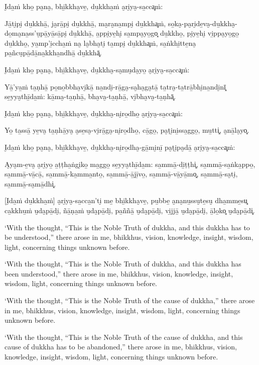 I̮da̱ṁ kho̱ pa̮na̮, bhi̱kkha̮ve̱, du̱kkha̱ṁ a̮ri̮ya̮-sa̱cca͓ṁ:

Jā̱ti̮pi̮ du̱kkhā̱, ja̮rā̱pi̮ du̱kkhā̱, ma̮ra̮na̱mpi̮ du̱kkha͓ṁ,
so̱ka̮-pa̮ri̮de̱va̮-du̱kkha̮-do̱ma̮na̱ss'u̮pā̱yā̱sā̱pi̮ du̱kkhā̱, a̱ppi̮ye̱hi̮ sa̱mpa̮yo̱go͓
du̱kkho̱, pi̮ye̱hi̮ vi̱ppa̮yo̱go̱ du̱kkho̱, ya̱mp'i̱ccha̱ṁ na̮ la̮bha̮ti̮ ta̱mpi̮ du̱kkha͓ṁ,
sa̱ṅkhi̱tte̱na̮ pa̱ñcu̮pā̱dā̱na̱kkha̱ndhā̱ du̱kkhā͓.

I̮da̱ṁ kho̱ pa̮na̮, bhi̱kkha̮ve̱, du̱kkha̮-sa̮mu̮da̮yo̱ a̮ri̮ya̮-sa̱cca͓ṁ:

Yā̱'ya̱ṁ ta̱ṇhā̱ po̱no̱bbha̮vi̮kā̱ na̱ndi̮-rā̱ga̮-sa̮ha̮ga̮tā̱ ta̱tra̮-ta̱trā̱bhi̮na̱ndi̮nī͓
se̱yya̮thī̱da̱ṁ: kā̱ma̮-ta̱ṇhā̱, bha̮va̮-ta̱ṇhā̱, vi̮bha̮va̮-ta̱ṇhā͓.

I̮da̱ṁ kho̱ pa̮na̮, bhi̱kkha̮ve̱, du̱kkha̮-ni̮ro̱dho̱ a̮ri̮ya̮-sa̱cca͓ṁ:

Yo̱ ta̱ssā̱ ye̱va̮ ta̱ṇhā̱ya̮ a̮se̱sa̮-vi̮rā̱ga̮-ni̮ro̱dho̱, cā̱go̱, pa̮ṭi̮ni̱ssa̱ggo̱, mu̱tti͓,
a̮nā̱la̮yo͓.

I̮da̱ṁ kho̱ pa̮na̮, bhi̱kkha̮ve̱, du̱kkha̮-ni̮ro̱dha̮-gā̱mi̮nī̱ pa̮ṭi̮pa̮dā̱ a̮ri̮ya̮-sa̱cca͓ṁ:

A̮ya̮m-e̱va̮ a̮ri̮yo̱ a̱ṭṭha̱ṅgi̮ko̱ ma̱ggo̱ se̱yya̮thī̱da̱m: sa̱mmā̱-di̱ṭṭhi͓,
sa̱mmā̱-sa̱ṅka̱ppo̱, sa̱mmā̱-vā̱cā̱, sa̱mmā̱-ka̱mma̱nto̱, sa̱mmā̱-ā̱jī̱vo̱, sa̱mmā̱-vā̱yā̱mo͓,
sa̱mmā̱-sa̮ti̮, sa̱mmā̱-sa̮mā̱dhi͓.

\enlargethispage{\baselineskip}

[I̮da̱ṁ du̱kkha̱ṁ] a̮ri̮ya̮-sa̱cca̱n'ti̮ me̱ bhi̱kkha̮ve̱, pu̱bbe̱ a̮na̮nu̱ssu̮te̱su̮ dha̱mme̱su͓
ca̱kkhu̱ṁ u̮da̮pā̱di̮, ñā̱ṇa̱ṁ u̮da̮pā̱di̮, pa̱ññā̱ u̮da̮pā̱di̮, vi̱jjā̱ u̮da̮pā̱di̮, ā̱lo̱ko͓
u̮da̮pā̱di͓.

\clearpage

\englishText
\markboth{\englishTitle}{\rightmark}

‘With the thought, “This is the Noble Truth of dukkha, and this dukkha
has to be understood,” there arose in me, bhikkhus, vision, knowledge,
insight, wisdom, light, concerning things unknown before.

‘With the thought, “This is the Noble Truth of dukkha, and this dukkha
has been understood,” there arose in me, bhikkhus, vision, knowledge,
insight, wisdom, light, concerning things unknown before.

‘With the thought, “This is the Noble Truth of the cause of dukkha,”
there arose in me, bhikkhus, vision, knowledge, insight, wisdom, light,
concerning things unknown before.

‘With the thought, “This is the Noble Truth of the cause of dukkha, and
this cause of dukkha has to be abandoned,” there arose in me, bhikkhus,
vision, knowledge, insight, wisdom, light, concerning things unknown
before.

